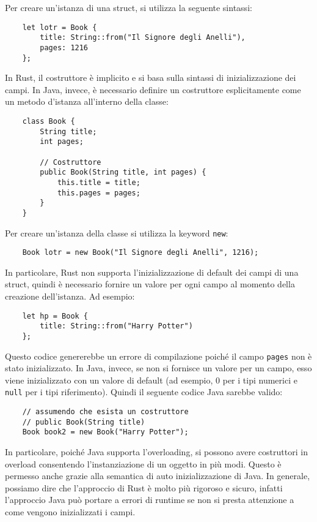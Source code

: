 Per creare un'istanza di una struct, si utilizza la seguente sintassi:
\begin{verbatim}
    let lotr = Book { 
        title: String::from("Il Signore degli Anelli"), 
        pages: 1216 
    };
\end{verbatim}
In Rust, il costruttore è implicito e si basa sulla sintassi di inizializzazione dei campi. In Java, invece, è necessario definire un costruttore esplicitamente come un metodo d'istanza all'interno della classe:
\begin{verbatim}
    class Book {
        String title;
        int pages;

        // Costruttore
        public Book(String title, int pages) {
            this.title = title;
            this.pages = pages;
        }
    }
\end{verbatim}
Per creare un'istanza della classe si utilizza la keyword \texttt{new}:
\begin{verbatim}
    Book lotr = new Book("Il Signore degli Anelli", 1216);
\end{verbatim}
In particolare, Rust non supporta l'inizializzazione di default dei campi di una struct, quindi è necessario fornire un valore per ogni campo al momento della creazione dell'istanza. Ad esempio:
\begin{verbatim}
    let hp = Book { 
        title: String::from("Harry Potter")
    };
\end{verbatim}
Questo codice genererebbe un errore di compilazione poiché il campo \texttt{pages} non è stato inizializzato. In Java, invece, se non si fornisce un valore per un campo, esso viene inizializzato con un valore di default (ad esempio, 0 per i tipi numerici e \texttt{null} per i tipi riferimento). Quindi il seguente codice Java sarebbe valido:
\begin{verbatim}
    // assumendo che esista un costruttore 
    // public Book(String title)
    Book book2 = new Book("Harry Potter");
\end{verbatim}
In particolare, poiché Java supporta l'overloading, si possono avere costruttori in overload consentendo l'instanziazione di un oggetto in più modi. Questo è permesso anche grazie alla semantica di auto inizializzazione di Java. In generale, possiamo dire che l'approccio di Rust è molto più rigoroso e sicuro, infatti l'approccio Java può portare a errori di runtime se non si presta attenzione a come vengono inizializzati i campi.

